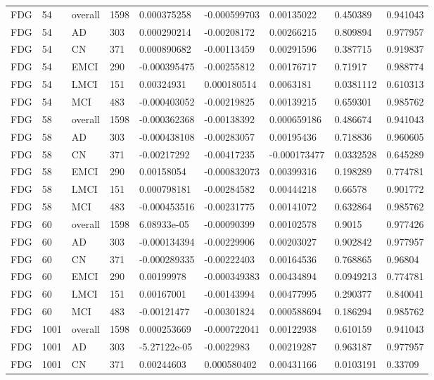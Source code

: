\begin{landscape}
\begin{longtable}{lllllllll}
FDG & 54 & overall & 1598 & 0.000375258 & -0.000599703 & 0.00135022 & 0.450389 & 0.941043 \\
FDG & 54 & AD & 303 & 0.000290214 & -0.00208172 & 0.00266215 & 0.809894 & 0.977957 \\
FDG & 54 & CN & 371 & 0.000890682 & -0.00113459 & 0.00291596 & 0.387715 & 0.919837 \\
FDG & 54 & EMCI & 290 & -0.000395475 & -0.00255812 & 0.00176717 & 0.71917 & 0.988774 \\
FDG & 54 & LMCI & 151 & 0.00324931 & 0.000180514 & 0.0063181 & 0.0381112 & 0.610313 \\
FDG & 54 & MCI & 483 & -0.000403052 & -0.00219825 & 0.00139215 & 0.659301 & 0.985762 \\
FDG & 58 & overall & 1598 & -0.000362368 & -0.00138392 & 0.000659186 & 0.486674 & 0.941043 \\
FDG & 58 & AD & 303 & -0.000438108 & -0.00283057 & 0.00195436 & 0.718836 & 0.960605 \\
FDG & 58 & CN & 371 & -0.00217292 & -0.00417235 & -0.000173477 & 0.0332528 & 0.645289 \\
FDG & 58 & EMCI & 290 & 0.00158054 & -0.000832073 & 0.00399316 & 0.198289 & 0.774781 \\
FDG & 58 & LMCI & 151 & 0.000798181 & -0.00284582 & 0.00444218 & 0.66578 & 0.901772 \\
FDG & 58 & MCI & 483 & -0.000453516 & -0.00231775 & 0.00141072 & 0.632864 & 0.985762 \\
FDG & 60 & overall & 1598 & 6.08933e-05 & -0.00090399 & 0.00102578 & 0.9015 & 0.977426 \\
FDG & 60 & AD & 303 & -0.000134394 & -0.00229906 & 0.00203027 & 0.902842 & 0.977957 \\
FDG & 60 & CN & 371 & -0.000289335 & -0.00222403 & 0.00164536 & 0.768865 & 0.96804 \\
FDG & 60 & EMCI & 290 & 0.00199978 & -0.000349383 & 0.00434894 & 0.0949213 & 0.774781 \\
FDG & 60 & LMCI & 151 & 0.00167001 & -0.00143994 & 0.00477995 & 0.290377 & 0.840041 \\
FDG & 60 & MCI & 483 & -0.00121477 & -0.00301824 & 0.000588694 & 0.186294 & 0.985762 \\
FDG & 1001 & overall & 1598 & 0.000253669 & -0.000722041 & 0.00122938 & 0.610159 & 0.941043 \\
FDG & 1001 & AD & 303 & -5.27122e-05 & -0.0022983 & 0.00219287 & 0.963187 & 0.977957 \\
FDG & 1001 & CN & 371 & 0.00244603 & 0.000580402 & 0.00431166 & 0.0103191 & 0.33709 \\

\end{longtable}
\end{landscape}
